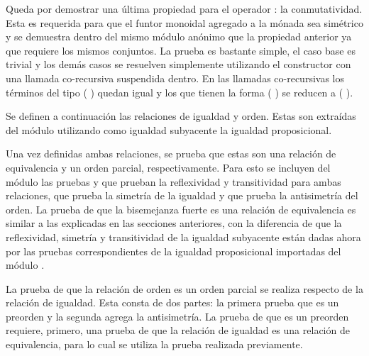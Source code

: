 \begin{AgdaAlign}
Queda por demostrar una última propiedad para el operador : la conmutatividad. Esta es requerida para que el funtor monoidal agregado a la mónada sea simétrico y se demuestra dentro del mismo módulo anónimo que la propiedad anterior ya que requiere los mismos conjuntos. La prueba es bastante simple, el caso base es trivial y los demás casos se resuelven simplemente utilizando el constructor  con una llamada co-recursiva suspendida dentro. En las llamadas co-recursivas los términos del tipo ( ) quedan igual y los que tienen la forma ( ) se reducen a (\AgdaField{$\flat$} ).


Se definen a continuación las relaciones de igualdad y orden. Estas son extraídas del módulo  utilizando como igualdad subyacente la igualdad proposicional. 


Una vez definidas ambas relaciones, se prueba que estas son una relación de equivalencia y un orden parcial, respectivamente. Para esto se incluyen del módulo  las pruebas  y  que prueban la reflexividad y transitividad para ambas relaciones,  que prueba la simetría de la igualdad y  que prueba la antisimetría del orden. La prueba de que la bisemejanza fuerte es una relación de equivalencia es similar a las explicadas en las secciones anteriores, con la diferencia de que la reflexividad, simetría y transitividad de la igualdad subyacente están dadas ahora por las pruebas correspondientes de la igualdad proposicional importadas del módulo .


La prueba de que la relación de orden es un orden parcial se realiza respecto de la relación de igualdad. Esta consta de dos partes: la primera prueba que es un preorden y la segunda agrega la antisimetría. La prueba de que es un preorden requiere, primero, una prueba de que la relación de igualdad es una relación de equivalencia, para lo cual se utiliza la prueba  realizada previamente. 


\end{AgdaAlign}
